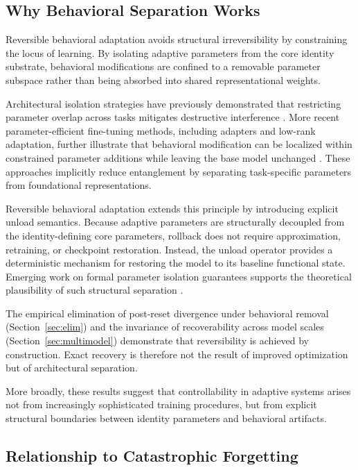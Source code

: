 \documentclass{article}
\begin{document}
	
	\subsection{Why Behavioral Separation Works}
	\label{sec:analysis_separation}
	
	Reversible behavioral adaptation avoids structural irreversibility by constraining the locus of learning. By isolating adaptive parameters from the core identity substrate, behavioral modifications are confined to a removable parameter subspace rather than being absorbed into shared representational weights.
	
	Architectural isolation strategies have previously demonstrated that restricting parameter overlap across tasks mitigates destructive interference \cite{rusu2016progressive,mallya2018packnet}. More recent parameter-efficient fine-tuning methods, including adapters and low-rank adaptation, further illustrate that behavioral modification can be localized within constrained parameter additions while leaving the base model unchanged \cite{houlsby2019adapter,hu2021lora}. These approaches implicitly reduce entanglement by separating task-specific parameters from foundational representations.
	
	Reversible behavioral adaptation extends this principle by introducing explicit unload semantics. Because adaptive parameters are structurally decoupled from the identity-defining core parameters, rollback does not require approximation, retraining, or checkpoint restoration. Instead, the unload operator provides a deterministic mechanism for restoring the model to its baseline functional state. Emerging work on formal parameter isolation guarantees supports the theoretical plausibility of such structural separation \cite{lanzillotta2023isolation}.
	
	The empirical elimination of post-reset divergence under behavioral removal (Section~\ref{sec:elim}) and the invariance of recoverability across model scales (Section~\ref{sec:multimodel}) demonstrate that reversibility is achieved by construction. Exact recovery is therefore not the result of improved optimization but of architectural separation.
	
	More broadly, these results suggest that controllability in adaptive systems arises not from increasingly sophisticated training procedures, but from explicit structural boundaries between identity parameters and behavioral artifacts.
	
	\subsection{Relationship to Catastrophic Forgetting}
	\label{sec:analysis_forgetting}
	
\end{document}
